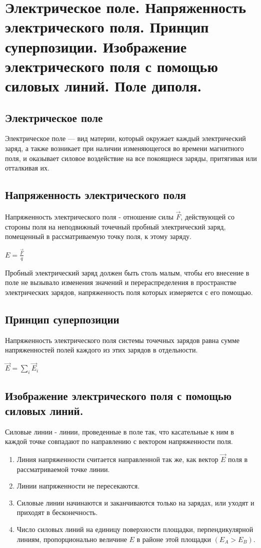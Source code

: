 \documentclass[12pt]{report}
\begin{document}
\section{Электрическое поле. Напряженность электрического поля.
  Принцип суперпозиции. Изображение электрического
  поля с помощью силовых линий. Поле диполя.}
\subsection{Электрическое поле}
Электрическое поле — вид материи, который окружает каждый электрический заряд, а также возникает при наличии изменяющегося во времени магнитного поля, и оказывает силовое воздействие на все покоящиеся заряды, притягивая или отталкивая их.

\subsection{Напряженность электрического поля}
Напряженность электрического поля - отношение силы $\vec{F}$, действующей со стороны поля на неподвижный точечный пробный электрический заряд, помещенный в рассматриваемую точку поля, к этому заряду.

\begin{center}
    $E = \frac{\vec{F}}{q}$
\end{center}

Пробный электрический заряд должен быть столь малым, чтобы его внесение в поле не вызывало изменения значений и перераспределения в пространстве электрических зарядов, напряженность поля которых измеряется с его помощью.

\subsection{Принцип суперпозиции}
Напряженность электрического поля системы точечных зарядов равна сумме напряженностей полей каждого из этих зарядов в отдельности.
\begin{center}
    $\vec{E} = \displaystyle\sum_{i}\vec{E}_i$
\end{center}
\subsection{Изображение электрического
    поля с помощью силовых линий.}
Силовые линии - линии, проведенные в поле так, что касательные к ним в
каждой точке совпадают по направлению с вектором
напряженности поля.\\
\begin{enumerate}
    \item Линия напряженности считается направленной так же, как вектор $\vec{E}$ поля в рассматриваемой точке линии.
    \item Линии напряженности не пересекаются.
    \item Силовые линии начинаются и заканчиваются только на зарядах, или уходят и приходят в бесконечность.
    \item Число силовых линий на единицу поверхности площадки, перпендикулярной линиям, пропорционально величине $E$ в районе этой площадки $(E_A > E_B)$.
\end{enumerate}
\end{document}
